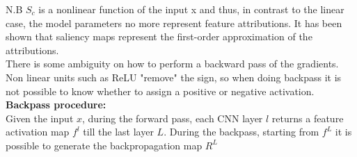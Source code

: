 N.B $S_c$ is a nonlinear function of the input x and thus, in contrast to the linear case, the model parameters no more represent feature attributions. It has been shown that saliency maps represent the first-order approximation of the attributions.\\

There is some ambiguity on how to perform a backward pass of the gradients. Non linear units such as ReLU "remove" the sign, so when doing backpass it is not possible
to know whether to assign a positive or negative activation.\\

\textbf{Backpass procedure:}\\
Given the input $x$, during the forward pass, each CNN layer $l$ returns a feature activation map $f^l$ till the last layer $L$.
During the backpass, starting from $f^L$ it is possible to generate the backpropagation map $R^L$